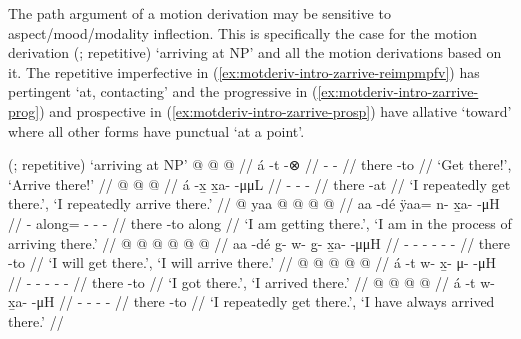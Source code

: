 \documentclass[12pt,letterpaper,oneside,article]{memoir}
\begin{document}
The path argument of a motion derivation may be sensitive to aspect/mood/modality inflection.
This is specifically the case for the motion derivation  (;  repetitive) ‘arriving at NP’ and all the motion derivations based on it.
The repetitive imperfective in (\ref{ex:motderiv-intro-zarrive-reimpmpfv}) has pertingent  ‘at, contacting’ and the progressive in (\ref{ex:motderiv-intro-zarrive-prog}) and prospective in (\ref{ex:motderiv-intro-zarrive-prosp}) have allative  ‘toward’ where all other forms have punctual  ‘at a point’.

\pex\label{ex:motderiv-intro-zarrive}%
\a\label{ex:motderiv-intro-zarrive-deriv}%
%
	 (;  repetitive) ‘arriving at NP’
\a\label{ex:motderiv-intro-zarrive-imp}%
%
\begingl
	\gla	{} @ {}  @ {} @ {} //
	\glb	á -t {}  -⊗ //
	\glc	{} - \·  - //
	\gld	there -to  {} {} //
	\glft	‘Get there!’, ‘Arrive there!’
		//
\endgl
\a\label{ex:motderiv-intro-zarrive-reimpmpfv}%
%
\begingl
	\gla	{} @ {}  @ {} @ {} //
	\glb	á -x̱ x̱a-  -μμL //
	\glc	{} - -  - //
	\gld	there -at  {} {} //
	\glft	‘I repeatedly get there.’, ‘I repeatedly arrive there.’
		//
\endgl
\a\label{ex:motderiv-intro-zarrive-prog}%
%
\begingl
	\gla	{} @ {} yaa @  @ {} @ {} @ {} //
	\glb	aa -dé ÿaa= n- x̱a-  -μH //
	\glc	{} - along= - -  - //
	\gld	there -to along  {} {} {} //
	\glft	‘I am getting there.’, ‘I am in the process of arriving there.’
		//
\endgl
\a\label{ex:motderiv-intro-zarrive-prosp}%
%
\begingl
	\gla	{} @ {}  @ {} @ {} @ {} @ {} @ {} //
	\glb	aa -dé g- w- g̱- x̱a-  -μμH //
	\glc	{} - - - - -  - //
	\gld	there -to  {} {} {} {} {} //
	\glft	‘I will get there.’, ‘I will arrive there.’
		//
\endgl
\a\label{ex:motderiv-intro-zarrive-pfv}%
%
\begingl
	\gla	{} @ {}  @ {} @ {} @ {} @ {} //
	\glb	á -t w- x̱- μ-  -μH //
	\glc	{} - - - -  - //
	\gld	there -to  {} {} {} {} //
	\glft	‘I got there.’, ‘I arrived there.’
		//
\endgl
\a\label{ex:motderiv-intro-zarrive-hab}%
%
\begingl
	\gla	{} @ {}  @ {} @ {} @ {} //
	\glb	á -t w- x̱a-  -μH //
	\glc	{} - - -   - //
	\gld	there -to  {} {} {} //
	\glft	‘I repeatedly get there.’, ‘I have always arrived there.’
		//
\endgl
\xe
\end{document}
